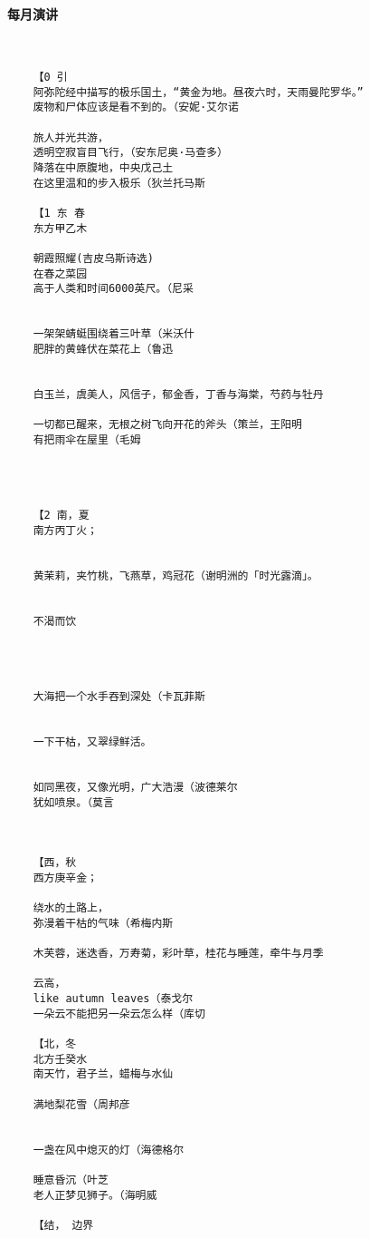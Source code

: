 \documentclass[UTF8]{Diaries}
\begin{document}
\paragraph{每月演讲}
\begin{lstlisting}


    【0 引
    阿弥陀经中描写的极乐国土，“黄金为地。昼夜六时，天雨曼陀罗华。”
    废物和尸体应该是看不到的。（安妮·艾尔诺

    旅人并光共游，
    透明空寂盲目飞行，（安东尼奥·马查多）
    降落在中原腹地，中央戊己土
    在这里温和的步入极乐（狄兰托马斯

    【1 东 春
    东方甲乙木

    朝霞照耀(吉皮乌斯诗选)
    在春之菜园
    高于人类和时间6000英尺。（尼采


    一架架蜻蜓围绕着三叶草（米沃什
    肥胖的黄蜂伏在菜花上（鲁迅

   
    白玉兰，虞美人，风信子，郁金香，丁香与海棠，芍药与牡丹
    
    一切都已醒来，无根之树飞向开花的斧头（策兰，王阳明
    有把雨伞在屋里（毛姆
    

    

    【2 南，夏
    南方丙丁火；


    黄茉莉，夹竹桃，飞燕草，鸡冠花（谢明洲的「时光露滴」。


    不渴而饮

    
    
    
    大海把一个水手吞到深处（卡瓦菲斯
    
    
    一下干枯，又翠绿鲜活。
    
    
    如同黑夜，又像光明，广大浩漫（波德莱尔
    犹如喷泉。（莫言

    
    
    【西，秋
    西方庚辛金；

    绕水的土路上，
    弥漫着干枯的气味（希梅内斯

    木芙蓉，迷迭香，万寿菊，彩叶草，桂花与睡莲，牵牛与月季

    云高，
    like autumn leaves（泰戈尔
    一朵云不能把另一朵云怎么样（库切

    【北，冬
    北方壬癸水
    南天竹，君子兰，蜡梅与水仙

    满地梨花雪（周邦彦
    

    一盏在风中熄灭的灯（海德格尔

    睡意昏沉（叶芝
    老人正梦见狮子。（海明威

    【结， 边界






\end{lstlisting}
\end{document}
